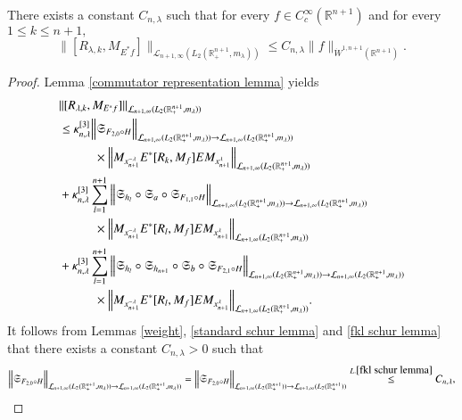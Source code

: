 \documentclass{amsart}
\begin{document}
\begin{lemma}\label{mta final lemma} There exists a constant $C_{n,\lambda}$ such that for every $f\in C^{\infty}_c(\mathbb{R}^{n+1})$ and for every $1\leq k\leq n+1,$
$$\|[R_{\lambda,k},M_{E^{\ast}f}]\|_{\mathcal{L}_{n+1,\infty}(L_2(\mathbb{R}^{n+1}_+,m_{\lambda}))}\leq C_{n,\lambda}\|f\|_{\dot{W}^{1,n+1}(\mathbb{R}^{n+1})}.$$
\end{lemma}
\begin{proof} Lemma \ref{commutator representation lemma} yields
\begin{align*}
&\|[R_{\lambda,k},M_{E^{\ast}f}]\|_{\mathcal{L}_{n+1,\infty}(L_2(\mathbb{R}^{n+1}_+,m_{\lambda}))}\\
&\leq \kappa_{n,\lambda}^{[3]}\Big\|\mathfrak{S}_{F_{2,0}\circ H}\Big\|_{\mathcal{L}_{n+1,\infty}(L_2(\mathbb{R}^{n+1}_+,m_{\lambda}))\to \mathcal{L}_{n+1,\infty}(L_2(\mathbb{R}^{n+1}_+,m_{\lambda}))}\\
&\hspace{1.0cm}\times\Big\| M_{x_{n+1}^{-\lambda}} E^{\ast}[R_k,M_f]E M_{x_{n+1}^{\lambda}}\Big\|_{\mathcal{L}_{n+1,\infty}(L_2(\mathbb{R}^{n+1}_+,m_{\lambda}))}\\
&+\kappa_{n,\lambda}^{[3]}\sum_{l=1}^{n+1}\Big\|\mathfrak{S}_{h_l}\circ\mathfrak{S}_a\circ\mathfrak{S}_{F_{1,1}\circ H}\Big\|_{\mathcal{L}_{n+1,\infty}(L_2(\mathbb{R}^{n+1}_+,m_{\lambda}))\to \mathcal{L}_{n+1,\infty}(L_2(\mathbb{R}^{n+1}_+,m_{\lambda}))}\\
&\hspace{1.0cm}\times\Big\|M_{x_{n+1}^{-\lambda}} E^{\ast}[R_l,M_f]E M_{x_{n+1}^{\lambda}}\Big\|_{\mathcal{L}_{n+1,\infty}(L_2(\mathbb{R}^{n+1}_+,m_{\lambda}))}\\
&+\kappa_{n,\lambda}^{[3]}\sum_{l=1}^{n+1}\Big\|\mathfrak{S}_{h_l}\circ\mathfrak{S}_{h_{n+1}}\circ\mathfrak{S}_b\circ\mathfrak{S}_{F_{2,1}\circ H}\Big\|_{\mathcal{L}_{n+1,\infty}(L_2(\mathbb{R}^{n+1}_+,m_{\lambda}))\to \mathcal{L}_{n+1,\infty}(L_2(\mathbb{R}^{n+1}_+,m_{\lambda}))}\\
&\hspace{1.0cm}\times\Big\|M_{x_{n+1}^{-\lambda}} E^{\ast}[R_l,M_f]E M_{x_{n+1}^{\lambda}}\Big\|_{\mathcal{L}_{n+1,\infty}(L_2(\mathbb{R}^{n+1}_+,m_{\lambda}))}.
\end{align*}
It follows from Lemmas \ref{weight}, \ref{standard schur lemma} and \ref{fkl schur lemma} that there exists a constant $C_{n,\lambda}>0$ such that
$$\Big\|\mathfrak{S}_{F_{2,0}\circ H}\Big\|_{\mathcal{L}_{n+1,\infty}(L_2(\mathbb{R}^{n+1}_+,m_{\lambda}))\to \mathcal{L}_{n+1,\infty}(L_2(\mathbb{R}^{n+1}_+,m_{\lambda}))}=\Big\|\mathfrak{S}_{F_{2,0}\circ H}\Big\|_{\mathcal{L}_{n+1,\infty}(L_2(\mathbb{R}^{n+1}_+))\to \mathcal{L}_{n+1,\infty}(L_2(\mathbb{R}^{n+1}_+))}\stackrel{L.\ref{fkl schur lemma}}{\leq}{C_{n,\lambda}},$$

\end{proof}
\end{document}
